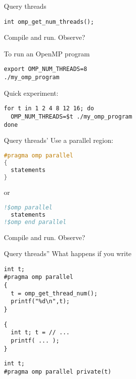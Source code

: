 \begin{numberedframe}{Query threads}
\begin{lstlisting}
int omp_get_num_threads();
\end{lstlisting}
Compile and run. Observe?
\end{numberedframe}

\begin{numberedframe}{To run an OpenMP program}
\begin{verbatim}
export OMP_NUM_THREADS=8
./my_omp_program
\end{verbatim}
Quick experiment:
\begin{verbatim}
for t in 1 2 4 8 12 16; do
  OMP_NUM_THREADS=$t ./my_omp_program
done
\end{verbatim}
\end{numberedframe}

\begin{numberedframe}{Query threads'}
Use a parallel region:
\begin{lstlisting}[language=C]
#pragma omp parallel
{
  statements
}
\end{lstlisting}
or
\begin{lstlisting}[language=Fortran]
!$omp parallel
  statements
!$omp end parallel
\end{lstlisting}
Compile and run. Observe?
\end{numberedframe}

\begin{numberedframe}{Query threads''}
What happens if you write
\begin{lstlisting}
int t;
#pragma omp parallel
{
  t = omp_get_thread_num();
  printf("%d\n",t);
}
\end{lstlisting}
\begin{multicols}{2}
\begin{lstlisting}
{
  int t; t = // ...
  printf( ... );
}
\end{lstlisting}
\columnbreak
\begin{lstlisting}
int t;
#pragma omp parallel private(t)
\end{lstlisting}
\end{multicols}
\end{numberedframe}

\begin{exerciseframe}[parallel]
  
\end{exerciseframe}

\begin{exerciseframe}[parallel]
  
\end{exerciseframe}

